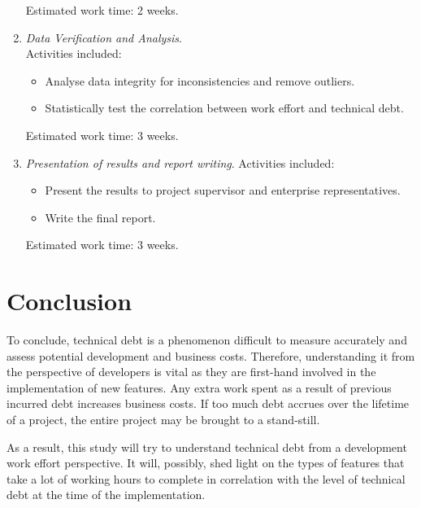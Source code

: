 \documentclass{mprop}
\begin{document}
\begin{enumerate}
	      Estimated work time: 2 weeks.\\

	\item \textit{Data Verification and Analysis}.\\
	      Activities included:
	      \begin{itemize}
		      \item Analyse data integrity for inconsistencies and remove outliers.
		      \item Statistically test the correlation between work effort and technical debt.
	      \end{itemize}

	      Estimated work time: 3 weeks.\\

	\item \textit{Presentation of results and report writing}.
	      Activities included:
	      \begin{itemize}
		      \item Present the results to project supervisor and enterprise
		            representatives.
		      \item Write the final report.
	      \end{itemize}
	      Estimated work time: 3 weeks.\\

\end{enumerate}

\section{Conclusion}

To conclude, technical debt is a phenomenon difficult to measure accurately and
assess potential development and business costs. Therefore, understanding it
from the perspective of developers is vital as they are first-hand involved in
the implementation of new features. Any extra work spent as a result of previous
incurred debt increases business costs. If too much debt accrues over the
lifetime of a project, the entire project may be brought to a stand-still.

As a result, this study will try to understand technical debt from a development
work effort perspective. It will, possibly, shed light on the types of features
that take a lot of working hours to complete in correlation with the level of
technical debt at the time of the implementation.
\end{document}
